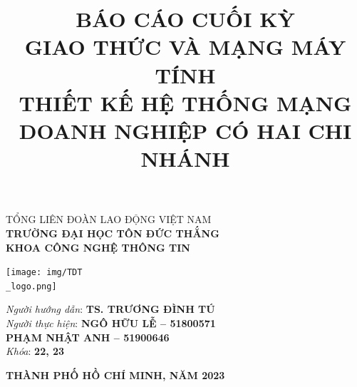 \documentclass[12pt,a4paper]{report}
\title{\textbf{BÁO CÁO CUỐI KỲ}\\
\textbf{GIAO THỨC VÀ MẠNG MÁY TÍNH}\\
\vspace{15pt}
\textbf{
THIẾT KẾ HỆ THỐNG MẠNG DOANH NGHIỆP CÓ HAI CHI NHÁNH}\\
}
\author{}
\date{}
\begin{document}
\begin{center} 
\large TỔNG LIÊN ĐOÀN LAO ĐỘNG VIỆT NAM
\\ \textbf{TRƯỜNG ĐẠI HỌC TÔN ĐỨC THẮNG} 
\\ \textbf{KHOA CÔNG NGHỆ THÔNG TIN} 
\large
\end{center}

\begin{center}
\texttt{[image: img/TDT\\\_logo.png]}
\end{center}
\vfill

\begingroup
\let\newpage\relax
\maketitle
\thispagestyle{empty}
\endgroup

\begin{flushright}
\textit{Người hướng dẫn}:
\textbf{TS. TRƯƠNG ĐÌNH TÚ }\\
\vspace{5pt}
\textit{Người thực hiện}:
\textbf{NGÔ HỮU LỄ – 51800571}\\
\vspace{5pt}
\textbf{PHẠM NHẬT ANH  – 51900646}\\
\vspace{5pt}
\textit{Khóa}:
\textbf{22, 23}\\
\vspace{5pt}
\begin{center} 
\large \textbf{THÀNH PHỐ HỒ CHÍ MINH, NĂM 2023}
\large
\end{center}
\end{flushright}
\vfill
\cleardoublepage
\end{document}
